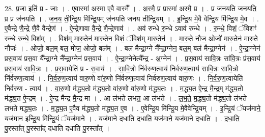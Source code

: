 \documentclass[17pt]{extarticle}
\begin{document}
28. प्र॒जा इति॑ प्र - जाः । . ए॒वास्मा॑ अस्मा ए॒वै वास्मै᳚ । . अ॒स्मै॒ प्र प्रास्मा॑ अस्मै॒ प्र । . प्र ज॑नयति जनयति॒ प्र प्र ज॑नयति । . ज॒न॒य॒ ती॒न्द्रि॒य मि॑न्द्रि॒यम् ज॑नयति जनय तीन्द्रि॒यम् । . इ॒न्द्रि॒य मे॒वै वेन्द्रि॒य मि॑न्द्रि॒य मे॒व । . ए॒वैन्द्रे णै॒न्द्रे णै॒वै वैन्द्रेण॑ । . ऐ॒न्द्रेणावा वै॒न्द्रे णै॒न्द्रेणाव॑ । . अव॑ रुन्धे रु॒न्धे ऽवाव॑ रुन्धे । . रु॒न्धे॒ विशं॒ ॅविशꣳ॑ रुन्धे रुन्धे॒ विश᳚म् । . विश॑म् मारु॒तेन॑ मारु॒तेन॒ विशं॒ ॅविश॑म् मारु॒तेन॑ । . मा॒रु॒ते नौज॒ ओजो॑ मारु॒तेन॑ मारु॒ते नौजः॑ । . ओजो॒ बल॒म् बल॒ मोज॒ ओजो॒ बल᳚म् । . बल॑ मैन्द्रा॒ग्ने नै᳚न्द्रा॒ग्नेन॒ बल॒म् बल॑ मैन्द्रा॒ग्नेन॑ । . ऐ॒न्द्रा॒ग्नेन॑ प्रस॒वाय॑ प्रस॒वा यै᳚न्द्रा॒ग्ने नै᳚न्द्रा॒ग्नेन॑ प्रस॒वाय॑ । . ऐ॒न्द्रा॒ग्नेनेत्यै᳚न्द्र - अ॒ग्नेन॑ । . प्र॒स॒वाय॑ सावि॒त्रः सा॑वि॒त्रः प्र॑स॒वाय॑ प्रस॒वाय॑ सावि॒त्रः । . प्र॒स॒वायेति॑ प्र - स॒वाय॑ । . सा॒वि॒त्रो नि॑र्वरुण॒त्वाय॑ निर्वरुण॒त्वाय॑ सावि॒त्रः सा॑वि॒त्रो नि॑र्वरुण॒त्वाय॑ । . नि॒र्व॒रु॒ण॒त्वाय॑ वारु॒णो वा॑रु॒णो नि॑र्वरुण॒त्वाय॑ निर्वरुण॒त्वाय॑ वारु॒णः । . नि॒र्व॒रु॒ण॒त्वायेति॑ निर्वरुण - त्वाय॑ । . वा॒रु॒णो म॑द्ध्य॒तो म॑द्ध्य॒तो वा॑रु॒णो वा॑रु॒णो म॑द्ध्य॒तः । . म॒द्ध्य॒त ऐ॒न्द्र मै॒न्द्रम् म॑द्ध्य॒तो म॑द्ध्य॒त ऐ॒न्द्रम् । . ऐ॒न्द्र मैन्द्र मै॒न्द्र मा । . आ ल॑भते लभत॒ आ ल॑भते । . ल॒भ॒ते॒ म॒द्ध्य॒तो म॑द्ध्य॒तो ल॑भते लभते मद्ध्य॒तः । . म॒द्ध्य॒त ए॒वैव म॑द्ध्य॒तो म॑द्ध्य॒त ए॒व । . ए॒वेन्द्रि॒य मि॑न्द्रि॒य मे॒वैवेन्द्रि॒यम् । . इ॒न्द्रि॒यं ॅयज॑माने॒ यज॑मान इन्द्रि॒य मि॑न्द्रि॒यं ॅयज॑माने । . यज॑माने दधाति दधाति॒ यज॑माने॒ यज॑माने दधाति । . द॒धा॒ति॒ पु॒रस्ता᳚त् पु॒रस्ता᳚द् दधाति दधाति पु॒रस्ता᳚त् । \newline
\end{document}
